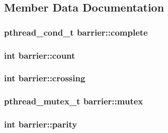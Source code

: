 \subsection{Member Data Documentation}
\hypertarget{classbarrier_aaccb992b02c15e2d52172f23ef789e84}{
\subsubsection[{complete}]{\setlength{\rightskip}{0pt plus 5cm}pthread\-\_\-cond\-\_\-t barrier\-::complete}}\label{classbarrier_aaccb992b02c15e2d52172f23ef789e84}
\hypertarget{classbarrier_af821728d23a551bede50945b7137336f}{
\subsubsection[{count}]{\setlength{\rightskip}{0pt plus 5cm}int barrier\-::count\hspace{0.3cm}{\ttfamily [private]}}}\label{classbarrier_af821728d23a551bede50945b7137336f}
\hypertarget{classbarrier_a861ba134352ae347a74209ee9c4c5ae4}{
\subsubsection[{crossing}]{\setlength{\rightskip}{0pt plus 5cm}int barrier\-::crossing}}\label{classbarrier_a861ba134352ae347a74209ee9c4c5ae4}
\hypertarget{classbarrier_ac0ce9d851bbc99779a8debd5d581930c}{
\subsubsection[{mutex}]{\setlength{\rightskip}{0pt plus 5cm}pthread\-\_\-mutex\-\_\-t barrier\-::mutex\hspace{0.3cm}{\ttfamily [private]}}}\label{classbarrier_ac0ce9d851bbc99779a8debd5d581930c}
\hypertarget{classbarrier_af939c567d20ea14eb2a6694e2b5839fc}{
\subsubsection[{parity}]{\setlength{\rightskip}{0pt plus 5cm}int barrier\-::parity\hspace{0.3cm}{\ttfamily [private]}}}\label{classbarrier_af939c567d20ea14eb2a6694e2b5839fc}
